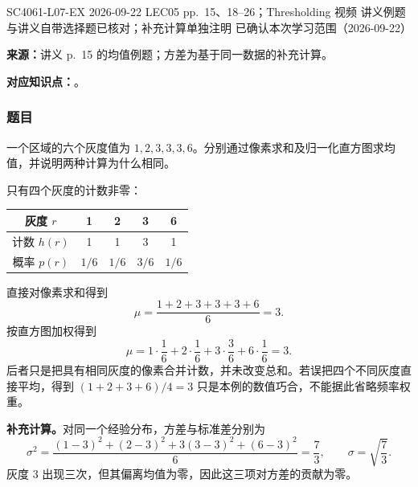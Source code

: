 

\examplemeta
  {SC4061-L07-EX}
  {2026-09-22}
  {LEC05 pp.~15、18--26；Thresholding 视频}
  {讲义例题与讲义自带选择题已核对；补充计算单独注明}
  {已确认本次学习范围（2026-09-22）}

\noindent\begin{minipage}{\linewidth}

\textbf{来源：}讲义 p.~15 的均值例题；方差为基于同一数据的补充计算。

\textbf{对应知识点：}。

\subsubsection*{题目}

一个区域的六个灰度值为 $1,2,3,3,3,6$。分别通过像素求和及归一化直方图求均值，并说明两种计算为什么相同。
\end{minipage}\par

\begin{checkedsolution}
只有四个灰度的计数非零：
\begin{center}
\begin{tabular}{ccccc}
  \toprule
  灰度 $r$ & 1 & 2 & 3 & 6 \\
  \midrule
  计数 $h(r)$ & 1 & 1 & 3 & 1 \\
  概率 $p(r)$ & $1/6$ & $1/6$ & $3/6$ & $1/6$ \\
  \bottomrule
\end{tabular}
\end{center}
直接对像素求和得到
\[
  \mu=\frac{1+2+3+3+3+6}{6}=3.
\]
按直方图加权得到
\[
  \mu=1\cdot\frac16+2\cdot\frac16+3\cdot\frac36+6\cdot\frac16=3.
\]
后者只是把具有相同灰度的像素合并计数，并未改变总和。若误把四个不同灰度直接平均，得到 $(1+2+3+6)/4=3$ 只是本例的数值巧合，不能据此省略频率权重。

\textbf{补充计算。}对同一个经验分布，方差与标准差分别为
\[
  \sigma^2=\frac{(1-3)^2+(2-3)^2+3(3-3)^2+(6-3)^2}{6}
  =\frac{7}{3},\qquad \sigma=\sqrt{\frac{7}{3}}.
\]
灰度 $3$ 出现三次，但其偏离均值为零，因此这三项对方差的贡献为零。
\end{checkedsolution}


